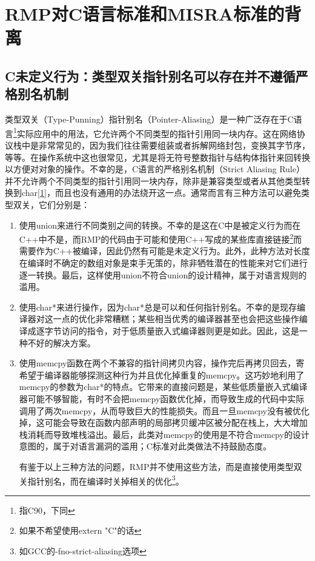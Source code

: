 \section{RMP对C语言标准和MISRA标准的背离}\label{sec:rmp-deviations-from-the-c-standard-and-misra}

\subsection{C未定义行为：类型双关指针别名可以存在并不遵循严格别名机制}\label{subsec:c-undefined-behaviour-type-punning-pointer-aliasing-may-exist-and-does-not-follow-strict-aliasing}

类型双关（Type-Punning）指针别名（Pointer-Aliasing）是一种广泛存在于C语言\footnote{指C90，下同}实际应用中的用法，它允许两个不同类型的指针引用同一块内存。这在网络协议栈中是非常常见的，因为我们往往需要组装或者拆解网络封包，变换其字节序，等等。在操作系统中这也很常见，尤其是将无符号整数指针与结构体指针来回转换以方便对对象的操作。不幸的是，C语言的严格别名机制（Strict
Aliasing
Rule）并不允许两个不同类型的指针引用同一块内存，除非是兼容类型或者从其他类型转换到char\hyperref[sec:chapter-bibliography-11]{{[}1{]}}，而且也没有通用的办法绕开这一点。通常而言有三种方法可以避免类型双关，它们分别是：

\begin{enumerate}
\def\labelenumi{\arabic{enumi}.}
\item
  使用union来进行不同类别之间的转换。不幸的是这在C中是被定义行为而在C++中不是，而RMP的代码由于可能和使用C++写成的某些库直接链接\footnote{如果不希望使用extern "C"的话}而需要作为C++被编译，因此仍然有可能是未定义行为。此外，此种方法对长度在编译时不确定的数组对象是束手无策的，除非牺牲潜在的性能来对它们进行逐一转换。最后，这样使用union不符合union的设计精神，属于对语言规则的滥用。
\item
  使用char*来进行操作，因为char*总是可以和任何指针别名。不幸的是现存编译器对这一点的优化非常糟糕；某些相当优秀的编译器甚至也会把这些操作编译成逐字节访问的指令，对于低质量嵌入式编译器则更是如此。因此，这是一种不好的解决方案。
\item
  使用memcpy函数在两个不兼容的指针间拷贝内容，操作完后再拷贝回去，寄希望于编译器能够探测这种行为并且优化掉重复的memcpy。这巧妙地利用了memcpy的参数为char*的特点。它带来的直接问题是，某些低质量嵌入式编译器可能不够智能，有时不会把memcpy函数优化掉，而导致生成的代码中实际调用了两次memcpy，从而导致巨大的性能损失。而且一旦memcpy没有被优化掉，这可能会导致在函数内部声明的局部拷贝缓冲区被分配在栈上，大大增加栈消耗而导致堆栈溢出。最后，此类对memcpy的使用是不符合memcpy的设计意图的，属于对语言漏洞的滥用；C标准对此类做法不持鼓励态度。

  有鉴于以上三种方法的问题，RMP并不使用这些方法，而是直接使用类型双关指针别名，而在编译时关掉相关的优化\footnote{如GCC的-fno-strict-aliasing选项}。
\end{enumerate}

